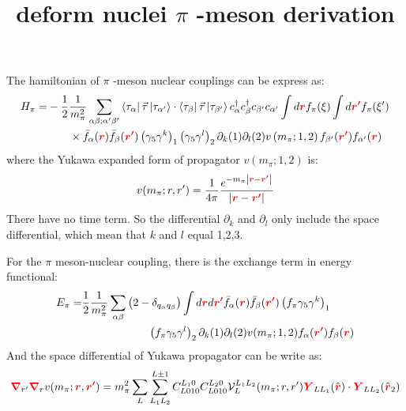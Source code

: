 \documentclass[a4paper]{article}
\newcommand{\no}{\nonumber}
\newcommand{\lcrl}[1]{\left<#1\right|}
\newcommand{\llrc}[1]{\left|#1\right>}
\newcommand{\bmm}[1]{{\color{red}\bm{#1}}}
\begin{document}
\renewcommand\figurename{图}%
\renewcommand\tablename{表}
\fontsize{12pt}{18pt}
\selectfont
\title{deform nuclei $\pi$ -meson derivation}
\maketitle

The hamiltonian of $\pi$ -meson nuclear couplings can be express as:
\begin{align}
\no H_{\pi}=&-\frac{1}{2}\frac{1}{m_{\pi}^{2}}\sum_{\alpha\beta;\alpha'\beta'}\lcrl{\tau_{\alpha}} \vec{\tau} \llrc{\tau_{\alpha'}}\cdot\lcrl{\tau_{\beta}}\vec{\tau}\llrc{\tau_{\beta'}}c_{\alpha}^{\dag}c_{\beta}^{\dag}c_{\beta'}c_{\alpha'}\int d\bmm{r}f_{\pi}(\xi)\int d\bmm{r'}f_{\pi}(\xi')\\
&\hspace{2em}\times \bar{f}_{\alpha}(\bmm{r})\bar{f}_{\beta}(\bmm{r'})\left(\gamma_{5}\gamma^{k}\right)_{1}\left(\gamma_{5}\gamma^{l}\right)_{2}\partial_{k}(1)\partial_{l}(2)v\left(m_{\pi};1,2\right)f_{\beta'}(\bmm{r'})f_{\alpha'}(\bmm{r})
\end{align}
where the Yukawa expanded form of propagator $v(m_{\pi};1,2)$ is:
\begin{align}
v(m_{\pi};r,r')=\frac{1}{4\pi}\frac{e^{-m_{\pi}\left|\bmm{r}-\bmm{r'}\right|}}{\left|\bmm{r}-\bmm{r'}\right|}
\end{align}
There have no time term. So the differential $\partial_{k}$ and $\partial_{l}$ only include the space differential, which mean that $k$ and $l$ equal 1,2,3.

For the $\pi$ meson-nuclear coupling, there is the exchange term in energy functional:
\begin{align}\label{equ:energyfunctional}
\no E_{\pi}=&\frac{1}{2}\frac{1}{m_{\pi}^{2}}\sum_{\alpha\beta}\left(2-\delta_{q_{\alpha}q_{\beta}}\right)\int d\bmm{r}d\bmm{r'}\bar{f}_{\alpha}(\bmm{r})\bar{f}_{\beta}(\bmm{r'})\left(f_{\pi}\gamma_{5}\gamma^{k}\right)_{1}\\
&\hspace{6em}\left(f_{\pi}\gamma_{5}\gamma^{l}\right)_{2}\partial_{k}(1)\partial_{l}(2)v(m_{\pi};1,2)f_{\alpha}(\bmm{r'})f_{\beta}(\bmm{r})
\end{align}
And the space differential of Yukawa propagator can be write as:
\begin{align}
\bmm{\nabla}_{r'}\bmm{\nabla}_{r}v(m_{\pi};\bmm{r},\bmm{r'})=m_{\pi}^{2}\sum_{L}\sum_{L_{1}L_{2}}^{L\pm1}C_{L010}^{L_1 0}C_{L010}^{L_2 0}\mathcal{V}_L^{L_1L_2}(m_{\pi};r,r')\bmm{Y}_{LL_{1}}(\hat{\bmm{r}})\cdot\bmm{Y}_{LL_{2}}(\hat{\bmm{r}}_{2})
\end{align}
\end{document}
